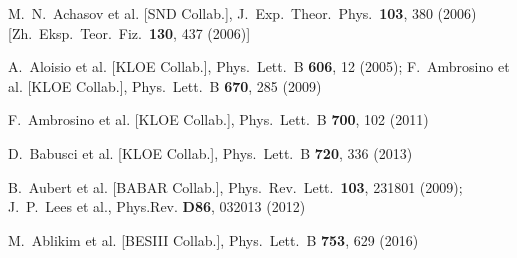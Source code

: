 \documentclass[epj,onecolumn]{webofc}
\begin{document}
\begin{thebibliography}{}
  M.~N.~Achasov et al. [SND Collab.],
  J.\ Exp.\ Theor.\ Phys.\  {\bf 103}, 380 (2006)
   [Zh.\ Eksp.\ Teor.\ Fiz.\  {\bf 130}, 437 (2006)]

  A.~Aloisio et al. [KLOE Collab.],
  Phys.\ Lett.\  B {\bf 606}, 12 (2005);
  F.~Ambrosino et al. [KLOE Collab.],
  Phys.\ Lett.\  B {\bf 670}, 285 (2009)

  F.~Ambrosino et al.  [KLOE Collab.],
  Phys.\ Lett.\ B {\bf 700}, 102 (2011)

  D.~Babusci et al.  [KLOE Collab.],
  Phys.\ Lett.\ B {\bf 720}, 336 (2013)

  B.~Aubert et al.  [BABAR Collab.],
  Phys.\ Rev.\ Lett.\  {\bf 103}, 231801 (2009);
  J.~P.~Lees et al.,
  Phys.Rev. {\bf D86}, 032013 (2012)

  M.~Ablikim et al. [BESIII Collab.],
  Phys.\ Lett.\ B {\bf 753}, 629 (2016)


\end{thebibliography}
\end{document}
